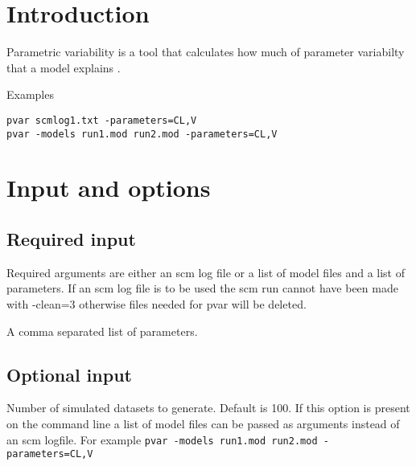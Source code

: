 

\newcommand{\guidetoolname}{pvar}



\maketitle


\section{Introduction}
Parametric variability is a tool that calculates how much of parameter variabilty that a model explains \cite{Hennig}.

Examples
\begin{verbatim}
pvar scmlog1.txt -parameters=CL,V
pvar -models run1.mod run2.mod -parameters=CL,V
\end{verbatim}

\section{Input and options}

\subsection{Required input}
Required arguments are either an scm log file or a list of model files and a list of parameters. If an scm log file is to be used the scm run cannot have been made with -clean=3 otherwise files needed for pvar will be deleted.

\begin{optionlist}

A comma separated list of parameters.
\nextopt
\end{optionlist}

\subsection{Optional input}

\begin{optionlist}
Number of simulated datasets to generate. Default is 100.
\nextopt
{}
If this option is present on the command line a list of model files can be passed as arguments instead of an scm logfile. For example \verb|pvar -models run1.mod run2.mod -parameters=CL,V|
\end{optionlist}

